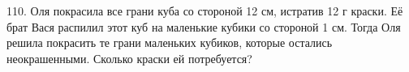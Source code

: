 110. Оля покрасила все грани куба со стороной 12 см, истратив 12 г краски. Её брат Вася распилил этот куб на маленькие кубики со стороной 1 см. Тогда Оля решила покрасить те грани маленьких кубиков, которые остались неокрашенными. Сколько краски ей потребуется?\\
